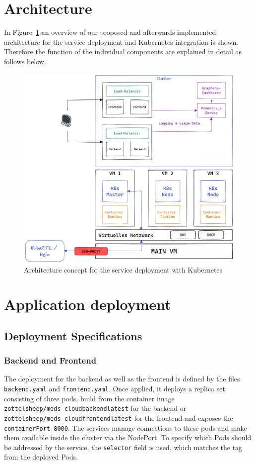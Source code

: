 \section{Architecture}
    In Figure~\ref{fig:Architecture} an overview of our proposed and afterwards implemented architecture for the service deployment and Kubernetes integration is shown. Therefore the function of the individual components are explained in detail as follows below.
    
    \begin{figure}[htbp]
        \includegraphics[width=15cm]{assets/architecture-overview.png}
        \centering
        \captionsetup{justification=centering, margin=1cm}
        \caption{Architecture concept for the service deployment with Kubernetes}
        \label{fig:Architecture}
    \end{figure}
\section{Application deployment}
    \subsection{Deployment Specifications}
        \subsubsection{Backend and Frontend}
            The deployment for the backend as well as the frontend is defined by the files \texttt{backend.yaml} and \texttt{frontend.yaml}.
            Once applied, it deploys a replica set consisting of three pods, build from the container image \texttt{zottelsheep/meds\_cloud\:backend\-latest} for the backend
            or \texttt{zottelsheep/meds\_cloud\:frontend\-latest} for the frontend and exposes the \texttt{containerPort 8000}.
            The services manage connections to these pods and make them available inside the cluster via the NodePort. 
            To specify which Pods should be addressed by the service, the \texttt{selector} field is used, which matches the tag from the deployed Pods.

